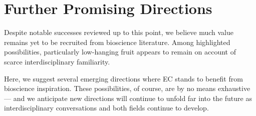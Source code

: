 \section{Further Promising Directions}
\label{sec:future}

Despite notable successes reviewed up to this point, we believe much value remains yet to be recruited from bioscience literature.
Among highlighted possibilities, particularly low-hanging fruit appears to remain on account of scarce interdisciplinary familiarity.

Here, we suggest several emerging directions where EC stands to benefit from bioscience inspiration.
These possibilities, of course, are by no means exhaustive --- and we anticipate new directions will continue to unfold far into the future as interdisciplinary conversations and both fields continue to develop.










